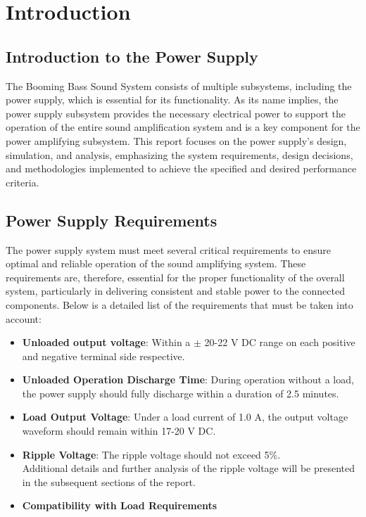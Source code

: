 \chapter{Introduction} 
\label{CircuitIntroduction}
\section{Introduction to the Power Supply}
The Booming Bass Sound System consists of multiple subsystems, including the power supply, which is essential for its functionality. As its name implies, the power supply subsystem provides the necessary electrical power to support the operation of the entire sound amplification system and is a key component for the power amplifying subsystem. This report focuses on the power supply's design, simulation, and analysis, emphasizing the system requirements, design decisions, and methodologies implemented to achieve the specified and desired performance criteria.

\section{Power Supply Requirements}
The power supply system must meet several critical requirements to ensure optimal and reliable operation of the sound amplifying system. These requirements are, therefore, essential for the proper functionality of the overall system, particularly in delivering consistent and stable power to the connected components. Below is a detailed list of the requirements that must be taken into account:
\begin{itemize}
    \item \textbf{Unloaded output voltage}: Within a $\pm$ 20-22 V DC range on each positive and negative terminal side respective. 
    \item \textbf{Unloaded Operation Discharge Time}: During operation without a load, the power supply should fully discharge within a duration of 2.5 minutes. 
    \item \textbf{Load Output Voltage}: Under a load current of 1.0 A, the output voltage waveform should remain within 17-20 V DC.
    \item \textbf{Ripple Voltage}: The ripple voltage should not exceed 5\%. \\
    Additional details and further analysis of the ripple voltage will be presented in the subsequent sections of the report.
    \item \textbf{Compatibility with Load Requirements}
\end{itemize}
